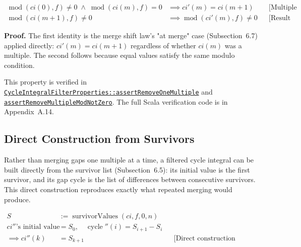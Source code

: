 \begin{equation*}
\begin{aligned}
\operatorname{mod}(ci(0), f) \neq 0 \;\land\; \operatorname{mod}(ci(m), f) = 0
&\implies ci'(m) = ci(m + 1)
&&\text{[Multiple removed]} \\
\operatorname{mod}(ci(m + 1), f) \neq 0
&\implies \operatorname{mod}(ci'(m), f) \neq 0
&&\text{[Result is not a multiple]}
\end{aligned}
\end{equation*}

\textbf{Proof.} The first identity is the merge shift law's "at merge" case
(Subsection~6.7) applied directly: $ci'(m) = ci(m + 1)$
regardless of whether $ci(m)$ was a multiple. The second follows because
equal values satisfy the same modulo condition.

{\raggedright
This property is verified in
\href{https://github.com/thiagomata/prime-numbers/blob/integral-cycle-article-v1.0.0/src/main/scala/v1/chapter4/cycle/integral/recursive/properties/CycleIntegralFilterProperties.scala}{\texttt{CycleIntegralFilterProperties::\allowbreak assertRemoveOneMultiple}}
and
\href{https://github.com/thiagomata/prime-numbers/blob/integral-cycle-article-v1.0.0/src/main/scala/v1/chapter4/cycle/integral/recursive/properties/CycleIntegralFilterProperties.scala}{\texttt{assertRemoveMultipleModNotZero}}.
The full Scala verification code is in Appendix~A.14.
\par}

\subsection{Direct Construction from Survivors}

Rather than merging gaps one multiple at a time, a filtered cycle integral
can be built directly from the survivor list (Subsection~6.5):
its initial value is the first survivor, and its gap cycle is the list of
differences between consecutive survivors. This direct construction
reproduces exactly what repeated merging would produce.

\begin{equation*}
\begin{aligned}
S &:= \operatorname{survivorValues}(ci, f, 0, n) \\
ci''\text{'s initial value} &= S_0,\quad \operatorname{cycle}''(i) = S_{i+1} - S_i \\
\implies ci''(k) &= S_{k + 1}
&&\text{[Direct construction matches survivors]}
\end{aligned}
\end{equation*}

